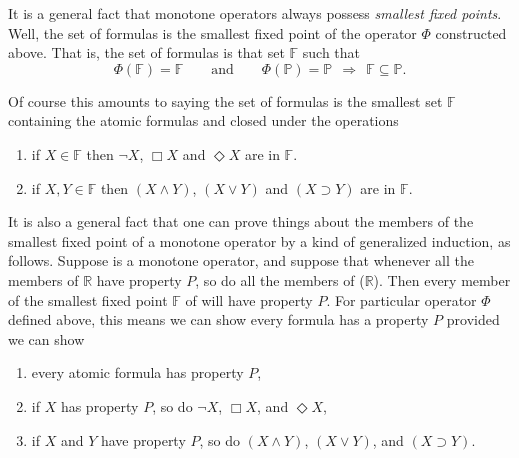 It is a general fact that monotone operators always possess \textit{smallest fixed points}.
% 
Well, 
the set of formulas is the smallest fixed point of the operator $\Phi$  constructed above. 
% 
That is, 
the set of formulas is that set $\mathbb{F}$ such that
\[
    \Phi(\mathbb{F}) = \mathbb{F} 
    \qquad
    \text{and} 
    \qquad 
    \Phi(\mathbb{P}) = \mathbb{P} ~~\Longrightarrow~~ \mathbb{F} \subseteq \mathbb{P}.
\]


Of course this amounts to saying the set of formulas is the smallest set $\mathbb{F}$ containing the atomic formulas and closed under the operations 
\begin{enumerate}[itemsep=5pt,parsep=5pt,leftmargin=3em,topsep=5pt,label=\arabic*)] %
    \item  
    if $X \in \mathbb{F}$ then $\neg X$, $\Box X$ and $\Diamond X$ are in $\mathbb{F}$.

    \item 
    if $X,Y \in \mathbb{F}$ then $(X \land Y)$, $(X \lor Y)$ and $(X \supset Y)$ are in $\mathbb{F}$.
\end{enumerate}



It is also a general fact that one can prove things about the members of the smallest fixed point of a monotone operator by a kind of generalized induction, as follows.
% 
Suppose  is a monotone operator, 
and suppose that whenever all the members of $\mathbb{R}$ have property $P$, 
so do all the members of ($\mathbb{R}$).
% 
Then every member of the smallest fixed point $\mathbb{F}$ of  will have property $P$.
%
%  
For particular operator $\Phi$ defined above, 
this means we can show every formula has a property $P$ provided we can show 
\begin{enumerate}[itemsep=5pt,parsep=5pt,leftmargin=3em,topsep=5pt,label=(\arabic*)] %
    \item every atomic formula has property $P$,

    \item if $X$ has property $P$, so do $\neg X$, $\Box X$, and $\Diamond X$,

    \item if $X$ and $Y$ have property $P$, so do $(X \land Y)$, $(X \lor Y)$, and $(X \supset Y)$.
\end{enumerate}


